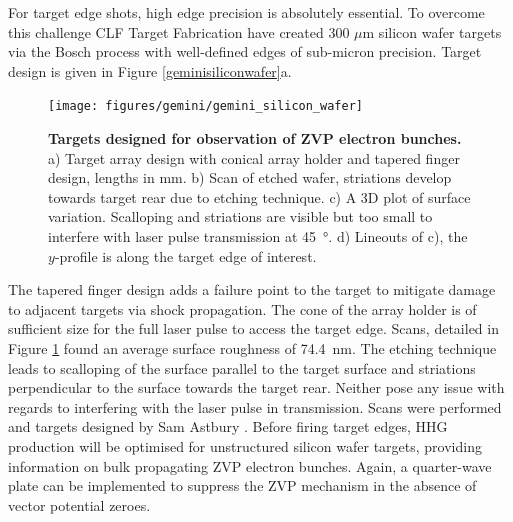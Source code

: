 For target edge shots, high edge precision is absolutely essential. To overcome this challenge CLF Target Fabrication have created 300 $\mu$m silicon wafer targets via the Bosch process with well-defined edges of sub-micron precision. Target design is given in Figure \ref{geminisiliconwafer}a.
\begin{figure}
	\centering
	\texttt{[image: figures/gemini/gemini\_silicon\_wafer]}
	\caption[Attosecond ZVP electron bunch targets]{\textbf{Targets designed for observation of ZVP electron bunches.} a) Target array design with conical array holder and tapered finger design, lengths in mm. b) Scan of etched wafer, striations develop towards target rear due to etching technique. c) A 3D plot of surface variation. Scalloping and striations are visible but too small to interfere with laser pulse transmission at \qty{45}{\degree}. d) Lineouts of c), the $y$-profile is along the target edge of interest.}
	\label{fig:geminisiliconwafer}
\end{figure}
The tapered finger design adds a failure point to the target to mitigate damage to adjacent targets via shock propagation. The cone of the array holder is of sufficient size for the full laser pulse to access the target edge. Scans, detailed in Figure \ref{fig:geminisiliconwafer} found an average surface roughness of \qty{74.4}{nm}. The etching technique leads to scalloping of the surface parallel to the target surface and striations perpendicular to the surface towards the target rear. Neither pose any issue with regards to interfering with the laser pulse in transmission. Scans were performed and targets designed by Sam Astbury \cite{astburyTargetFabricationGroup2024}. Before firing target edges, HHG production will be optimised for unstructured silicon wafer targets, providing information on bulk propagating ZVP electron bunches. Again, a quarter-wave plate can be implemented to suppress the ZVP mechanism in the absence of vector potential zeroes.

